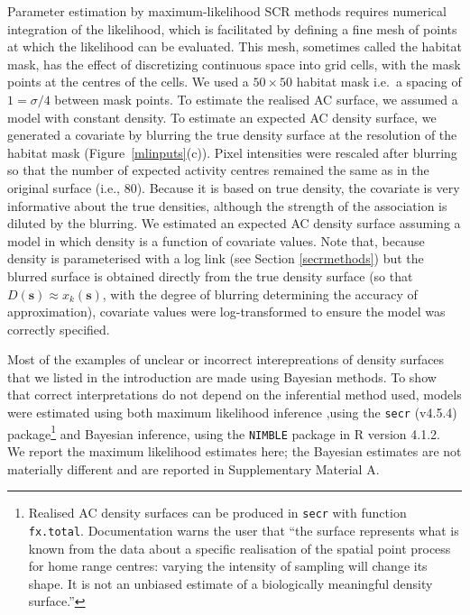 \documentclass[useAMS,usenatbib,referee]{biom}
\begin{document}
Parameter estimation by maximum-likelihood SCR methods requires numerical integration of the likelihood, which is facilitated by defining a fine mesh of points at which the likelihood can be evaluated. This mesh, sometimes called the habitat mask, has the effect of discretizing continuous space into grid cells, with the mask points at the centres of the cells. We used a $50\times 50$ habitat mask i.e.\, a spacing of $1=\sigma/4$ between mask points. To estimate the realised AC surface, we assumed a model with constant density. To estimate an expected AC density surface, we generated a covariate by blurring the true density surface at the resolution of the habitat mask (Figure~\ref{mlinputs}(c)). Pixel intensities were rescaled after blurring so that the number of expected activity centres remained the same as in the original surface (i.e., 80). Because it is based on true density, the covariate is very informative about the true densities, although the strength of the association is diluted by the blurring. We estimated an expected AC density surface assuming a model in which density is a function of covariate values. Note that, because density is parameterised with a log link (see Section \ref{secrmethods}) but the blurred surface is obtained directly from the true density surface (so that $D(\mathbf{s})\approx x_k(\mathbf{s})$, with the degree of blurring determining the accuracy of approximation), covariate values were log-transformed to ensure the model was correctly specified.%

Most of the examples of unclear or incorrect interepreations of density surfaces that we listed in the introduction are made using Bayesian methods. To show that correct interpretations do not depend on the inferential method used, models were estimated using both maximum likelihood inference ,using the \texttt{secr} (v4.5.4) package\footnote{Realised AC density surfaces can be produced in \texttt{secr} with function \texttt{fx.total}. Documentation warns the user that ``the surface represents what is known from the data about a specific realisation of the spatial point process for home range centres: varying the intensity of sampling will change its shape. It is not an unbiased estimate of a biologically meaningful density surface.''} \citep{secr:21} and Bayesian inference, using the \texttt{NIMBLE} package \citep{deValpine:17, Turek:21} in R version 4.1.2. We report the maximum likelihood estimates here; the Bayesian estimates are not materially different and are reported in Supplementary Material A.
\end{document}
